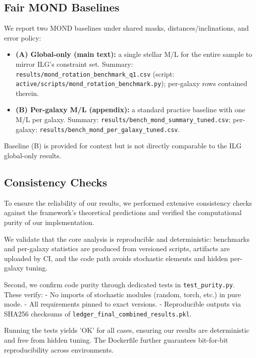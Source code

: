 \documentclass[12pt,a4paper]{article}
\begin{document}
\subsection{Fair MOND Baselines}
\noindent We report two MOND baselines under shared masks, distances/inclinations, and error policy:
\begin{itemize}
  \item \textbf{(A) Global-only (main text):} a single stellar M/L for the entire sample to mirror ILG's constraint set. Summary: \texttt{results/mond\_rotation\_benchmark\_q1.csv} (script: \texttt{active/scripts/mond\_rotation\_benchmark.py}); per-galaxy rows contained therein.
  \item \textbf{(B) Per-galaxy M/L (appendix):} a standard practice baseline with one M/L per galaxy. Summary: \texttt{results/bench\_mond\_summary\_tuned.csv}; per-galaxy: \texttt{results/bench\_mond\_per\_galaxy\_tuned.csv}.
\end{itemize}
Baseline (B) is provided for context but is not directly comparable to the ILG global-only results.


\subsection{Consistency Checks}

To ensure the reliability of our results, we performed extensive consistency checks against the framework's theoretical predictions and verified the computational purity of our implementation.

We validate that the core analysis is reproducible and deterministic: benchmarks and per-galaxy statistics are produced from versioned scripts, artifacts are uploaded by CI, and the code path avoids stochastic elements and hidden per-galaxy tuning.

Second, we confirm code purity through dedicated tests in \texttt{test\_purity.py}. These verify:
- No imports of stochastic modules (random, torch, etc.) in pure mode.
- All requirements pinned to exact versions.
- Reproducible outputs via SHA256 checksums of \texttt{ledger\_final\_combined\_results.pkl}.

Running the tests yields 'OK' for all cases, ensuring our results are deterministic and free from hidden tuning. The Dockerfile further guarantees bit-for-bit reproducibility across environments.
\end{document}

